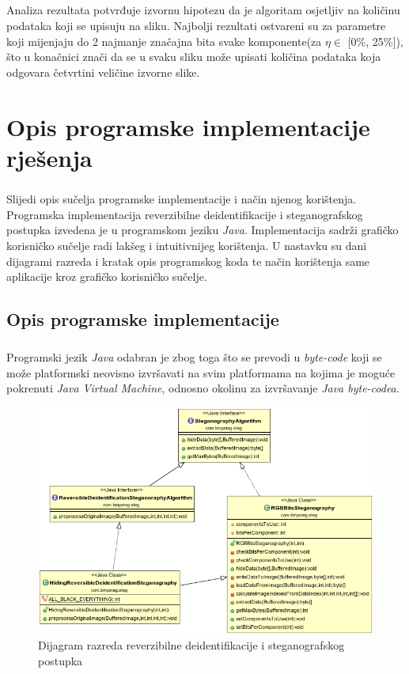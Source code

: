\documentclass[times, utf8, seminar, numeric]{fer}
\begin{document}
\paragraph{}
Analiza rezultata potvrđuje izvornu hipotezu da je algoritam osjetljiv na količinu podataka koji se upisuju na sliku. Najbolji rezultati ostvareni su za parametre koji mijenjaju do 2 najmanje značajna bita svake komponente(za $\eta \in$ [0\%, 25\%]), što u konačnici znači da se u svaku sliku može upisati količina podataka koja odgovara četvrtini veličine izvorne slike.
\chapter{Opis programske implementacije rješenja}
\paragraph{}
Slijedi opis sučelja programske implementacije i način njenog korištenja. Programska implementacija reverzibilne deidentifikacije i steganografskog postupka izvedena je u programskom jeziku \textit{Java}. Implementacija sadrži grafičko korisničko sučelje radi lakšeg i intuitivnijeg korištenja. U nastavku su dani dijagrami razreda i kratak opis programskog koda te način korištenja same aplikacije kroz grafičko korisničko sučelje.

\section{Opis programske implementacije}
\paragraph{}
Programski jezik \textit{Java} odabran je zbog toga što se prevodi u \textit{byte-code} koji se može platformski neovisno izvršavati na svim platformama na kojima je moguće pokrenuti \textit{Java Virtual Machine}, odnosno okolinu za izvršavanje \textit{Java byte-codea}.

\begin{figure}
\caption{Dijagram razreda reverzibilne deidentifikacije i steganografskog postupka}
\label{steg_class_diagram}
\centerline{\includegraphics[scale=0.4]{images/steg_class_diagram.png}}
\end{figure}
\end{document}
